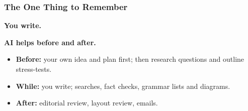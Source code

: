 
\begin{frame}[fragile]\frametitle{The One Thing to Remember}
\begin{center}
\Large
\textbf{You write.}

\medskip
\textbf{AI helps before and after.}
\end{center}

\medskip
\begin{itemize}
\item \textbf{Before:} your own idea and plan first; then research questions and outline stress-tests.
\item \textbf{While:} you write; searches, fact checks, grammar lists and diagrams.
\item \textbf{After:} editorial review, layout review, emails.
\end{itemize}
\end{frame}

